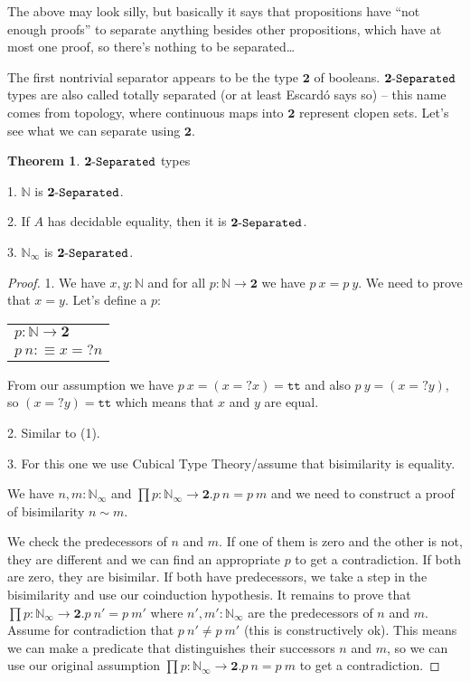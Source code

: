 \documentclass[11pt]{article}
\theoremstyle{definition}
\newtheorem{theorem}{Theorem}[section]
\newcommand{\txt}[1]{\texttt{#1}}
\renewcommand{\(}{\left(}
\renewcommand{\)}{\right)}
\newcommand{\defn}{:\equiv}
\newcommand{\apl}[2]{#1\ #2}
\newcommand{\Bool}{\mathbf{2}}
\newcommand{\true}{\txt{tt}}
\newcommand{\Nat}{\mathbb{N}}
\newcommand{\Conat}{\mathbb{N}_\infty}
\newcommand{\dprod}[2]{\prod #1.#2}
\begin{document}
The above may look silly, but basically it says that propositions have ``not enough proofs'' to separate anything besides other propositions, which have at most one proof, so there's nothing to be separated\dots

The first nontrivial separator appears to be the type $\Bool$ of booleans. $\Separated{\Bool}$ types are also called totally separated (or at least Escard\'{o} says so) -- this name comes from topology, where continuous maps into $\Bool$ represent clopen sets. Let's see what we can separate using $\Bool$.

\begin{theorem} $\Separated{\Bool}$ types

1. $\Nat$ is $\Separated{\Bool}$.

2. If $A$ has decidable equality, then it is $\Separated{\Bool}$.

3. $\Conat$ is $\Separated{\Bool}$.

\end{theorem}
\begin{proof}
1. We have $x, y : \Nat$ and for all $p : \Nat \to \Bool$ we have $\apl{p}{x} = \apl{p}{y}$. We need to prove that $x = y$. Let's define a $p$:

\begin{center}
\begin{tabular}{l}
$p : \Nat \to \Bool$ \\
$\apl{p}{n} \defn x =? n$
\end{tabular}
\end{center}

From our assumption we have $\apl{p}{x} = (x =? x) = \true$ and also $\apl{p}{y} = (x =? y)$, so $(x =? y) = \true$ which means that $x$ and $y$ are equal.

2. Similar to (1).

3. For this one we use Cubical Type Theory/assume that bisimilarity is equality.

We have $n, m : \Conat$ and $\dprod{p : \Conat \to \Bool}{\apl{p}{n} = \apl{p}{m}}$ and we need to construct a proof of bisimilarity $n \sim m$.

We check the predecessors of $n$ and $m$. If one of them is zero and the other is not, they are different and we can find an appropriate $p$ to get a contradiction. If both are zero, they are bisimilar. If both have predecessors, we take a step in the bisimilarity and use our coinduction hypothesis. It remains to prove that $\dprod{p : \Conat \to \Bool}{\apl{p}{n'} = \apl{p}{m'}}$ where $n', m' : \Conat$ are the predecessors of $n$ and $m$. Assume for contradiction that $\apl{p}{n'} \neq \apl{p}{m'}$ (this is constructively ok). This means we can make a predicate that distinguishes their successors $n$ and $m$, so we can use our original assumption $\dprod{p : \Conat \to \Bool}{\apl{p}{n} = \apl{p}{m}}$ to get a contradiction.

\end{proof}
\end{document}
